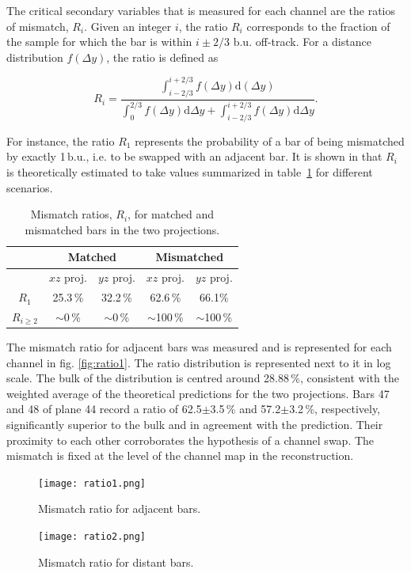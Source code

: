 \documentclass[a4paper,11pt]{article}
\begin{document}
The critical secondary variables that is measured for each channel are the ratios of mismatch, $R_i$. Given an integer $i$, the ratio $R_i$ corresponds to the fraction of the sample for which the bar is within $i\pm2/3$ $\mathrm{b.u.}$ off-track. For a distance distribution $f(\Delta y)$, the ratio is defined as

\begin{equation}
R_i=\frac{\int_{i-2/3}^{i+2/3}f(\Delta y)\mathrm{d}(\Delta y)}{\int_{0}^{2/3}f(\Delta y)\mathrm{d}\Delta y+\int_{i-2/3}^{i+2/3}f(\Delta y)\mathrm{d}\Delta y}.
\end{equation}

For instance, the ratio $R_1$ represents the probability of a bar of being mismatched by exactly 1\,$\mathrm{b.u.}$, i.e. to be swapped with an adjacent bar. It is shown in \cite{Francois} that $R_i$ is theoretically estimated to take values summarized in table~\ref{tab:mismatch_ratio} for different scenarios.

\begin{table}[!h]
 \centering
 \begin{tabular}{c|c|c|c|c}
  & \multicolumn{2}{c|}{Matched} & \multicolumn{2}{c}{Mismatched}  \\
  \hline
  & $xz$ proj. & $yz$ proj. & $xz$ proj. & $yz$ proj. \\
  \hline
  $R_1$ & 25.3\,\% & 32.2\,\% & 62.6\,\% & 66.1\%  \\
  $R_{i\geq2}$ & $\sim$0\,\% & $\sim$0\,\% & $\sim$100\,\% & $\sim$100\,\%
 \end{tabular}
 \caption{Mismatch ratios, $R_i$, for matched and mismatched bars in the two projections.}
 \label{tab:mismatch_ratio}
\end{table}

The mismatch ratio for adjacent bars was measured and is represented for each channel in fig. \ref{fig:ratio1}. The ratio distribution is represented next to it in log scale. The bulk of the distribution is centred around 28.88\,\%, consistent with the weighted average of the theoretical predictions for the two projections. Bars 47 and 48 of plane 44 record a ratio of 62.5$\pm$3.5\,\% and 57.2$\pm$3.2\,\%, respectively, significantly superior to the bulk and in agreement with the prediction. Their proximity to each other corroborates the hypothesis of a channel swap. The mismatch is fixed at the level of the channel map in the reconstruction.

\begin{figure}[htr!]
  \begin{minipage}[b]{.49\textwidth}
   \centering
   \texttt{[image: ratio1.png]}
   \caption{Mismatch ratio for adjacent bars.}
   \label{fig:ratio1}
  \end{minipage}
  \begin{minipage}[b]{.49\textwidth}
   \centering
   \texttt{[image: ratio2.png]}
   \caption{Mismatch ratio for distant bars.}
   \label{fig:ratio2}
  \end{minipage}
\end{figure}
\end{document}
